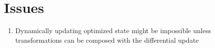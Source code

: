 \documentclass[12pt]{article}
\begin{document}

\section{Issues}

\begin{enumerate}
  \item Dynamically updating optimized state might be impossible unless transformations can be composed with the differential update
\end{enumerate}
\end{document}
